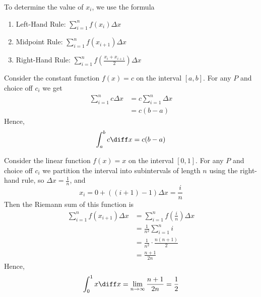 \begin{rem}\label{rem-definite-integral}
	To determine the value of $x_i$, we use the formula
	\begin{enumerate}
		\item Left-Hand Rule: $\sum_{i=1}^n f(x_i)\Delta x$
		\item Midpoint Rule: $\sum_{i=1}^n f(x_{i+1})\Delta x$
		\item Right-Hand Rule: $\sum_{i=1}^n f\left(\frac{x_i+x_{i+1}}{2}\right)\Delta x$
	\end{enumerate}
\end{rem}

\begin{exm}\label{exm-riemann-sum:1}
	Consider the constant function $f(x)=c$ on the interval $[a,b]$. For any $P$
	and choice off $c_i$ we get
	\begin{align*}
		\sum_{i=1}^n c \Delta x & = c \sum_{i=1}^n \Delta x \\
		                        & = c (b-a)
	\end{align*}
	Hence,
	\begin{equation*}
		\int_a^b c \diff x = c(b-a)
	\end{equation*}
\end{exm}

\begin{exm}\label{exm-riemann-sum:2}
	Consider the linear function $f(x)=x$ on the interval $[0,1]$. For any $P$
	and choice off $c_i$ we partition the interval into subintervals of length $n$
	using the right-hand rule, so $\Delta x = \frac{1}{n}$, and
	\begin{equation*}
		x_i = 0 + ((i+1)-1)\Delta x = \frac{i}{n}
	\end{equation*}
	Then the Riemann sum of this function is
	\begin{align*}
		\sum_{i=1}^n f(x_{i+1}) \Delta x & = \sum_{i=1}^n f\left(\frac{i}{n}\right)\Delta x \\
		                                 & = \frac{1}{n^2} \sum_{i=1}^n i                   \\
		                                 & = \frac{1}{n^2} \cdot \frac{n(n+1)}{2}           \\
		                                 & = \frac{n+1}{2n}
	\end{align*}
	Hence,
	\begin{equation*}
		\int_0^1 x \diff x = \lim_{n\to\infty}\frac{n+1}{2n} = \frac{1}{2}
	\end{equation*}
\end{exm}

